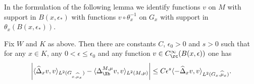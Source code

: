 In the formulation of the following lemma we identify functions $v$ on $M$ with support in $B(x,\epsilon_*)$ with functions $v\circ\theta_x^{-1}$ on $G_{x}$ with support in $\theta_x(B(x,\epsilon_*))$.

\begin{lemma}\label{l:remainder2}
Fix $W$ and $K$ as above. Then there are constants $C$, $\epsilon_0>0$ and $s>0$ such that for any $x\in K$, any $0<\epsilon\leq\epsilon_0$ and any function $v\in C^\infty_\rc(B(x,\epsilon))$ one has
\begin{align*}
\left| \langle \widehat{\Delta}_{x} v, v \rangle_{L^2(G_{x,\widehat\mu_{x}})} - \langle \Delta_\Xb^{M,\mu} v, v \rangle_{L^2(M,\mu)}\right| \leq C \epsilon^s \langle - \widehat{\Delta}_{x} v, v \rangle_{L^2(G_{x},\widehat\mu_{x})}.
\end{align*}
\end{lemma}

